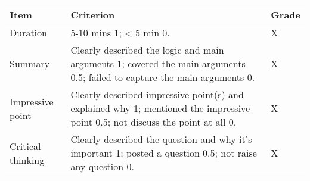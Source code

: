 \documentclass[11pt,]{article}
\theoremstyle{definition}
\theoremstyle{definition}
\theoremstyle{definition}
\theoremstyle{remark}
\begin{document}
\begin{longtable}[]{@{}lll@{}}
\toprule
\begin{minipage}[b]{0.16\columnwidth}\raggedright\strut
Item\strut
\end{minipage} & \begin{minipage}[b]{0.72\columnwidth}\raggedright\strut
Criterion\strut
\end{minipage} & \begin{minipage}[b]{0.04\columnwidth}\raggedright\strut
Grade\strut
\end{minipage}\tabularnewline
\midrule
\endhead
\begin{minipage}[t]{0.16\columnwidth}\raggedright\strut
Duration\strut
\end{minipage} & \begin{minipage}[t]{0.72\columnwidth}\raggedright\strut
5-10 mins 1; \textless{} 5 min 0.\strut
\end{minipage} & \begin{minipage}[t]{0.04\columnwidth}\raggedright\strut
X\strut
\end{minipage}\tabularnewline
\begin{minipage}[t]{0.16\columnwidth}\raggedright\strut
Summary\strut
\end{minipage} & \begin{minipage}[t]{0.72\columnwidth}\raggedright\strut
Clearly described the logic and main arguments 1; covered the main
arguments 0.5; failed to capture the main arguments 0.\strut
\end{minipage} & \begin{minipage}[t]{0.04\columnwidth}\raggedright\strut
X\strut
\end{minipage}\tabularnewline
\begin{minipage}[t]{0.16\columnwidth}\raggedright\strut
Impressive point\strut
\end{minipage} & \begin{minipage}[t]{0.72\columnwidth}\raggedright\strut
Clearly described impressive point(s) and explained why 1; mentioned the
impressive point 0.5; not discuss the point at all 0.\strut
\end{minipage} & \begin{minipage}[t]{0.04\columnwidth}\raggedright\strut
X\strut
\end{minipage}\tabularnewline
\begin{minipage}[t]{0.16\columnwidth}\raggedright\strut
Critical thinking\strut
\end{minipage} & \begin{minipage}[t]{0.72\columnwidth}\raggedright\strut
Clearly described the question and why it's important 1; posted a
question 0.5; not raise any question 0.\strut
\end{minipage} & \begin{minipage}[t]{0.04\columnwidth}\raggedright\strut
X\strut
\end{minipage}\tabularnewline
\bottomrule
\end{longtable}
\end{document}
